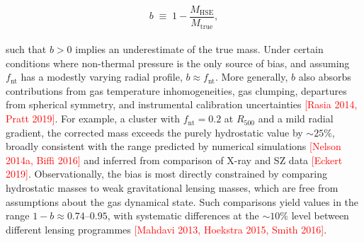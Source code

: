 \begin{equation}
	b \;\equiv\; 1 - \frac{M_{\mathrm{HSE}}}{M_{\mathrm{true}}},
	\label{eq:mass_bias}
\end{equation}
\\
such that $b > 0$ implies an underestimate of the true mass. Under certain conditions where non-thermal pressure is the only source of bias, and assuming $f_\mathrm{nt}$ has a modestly varying radial profile, $b \approx f_{\mathrm{nt}}$. More generally, $b$ also absorbs contributions from gas temperature inhomogeneities, gas clumping, departures from spherical symmetry, and instrumental calibration uncertainties \textcolor{red}{[Rasia 2014, Pratt 2019]}. For example, a cluster with $f_{\mathrm{nt}} = 0.2$ at $R_{500}$ and a mild radial gradient, the corrected mass exceeds the purely hydrostatic value by $\sim 25\%$, broadly consistent with the range predicted by numerical simulations \textcolor{red}{[Nelson 2014a, Biffi 2016]} and inferred from  comparison of X-ray and SZ data \textcolor{red}{[Eckert 2019]}. Observationally, the bias is most directly constrained by comparing hydrostatic masses to weak gravitational lensing masses, which are free from assumptions about the gas dynamical state. Such comparisons yield values in the range $1 - b \approx 0.74$--$0.95$, with systematic differences at the $\sim 10\%$ level between different lensing programmes \textcolor{red}{[Mahdavi 2013, Hoekstra 2015, Smith 2016]}.
\newpage



